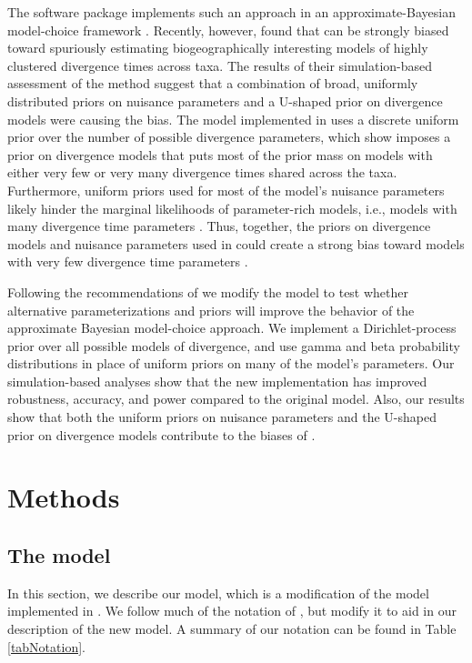\documentclass[letterpaper,12pt]{article}
\begin{document}
\begin{linenumbers}
The software package \msb implements such an approach in an
approximate-Bayesian model-choice framework \citep{Hickerson2006,Huang2011}.
Recently, however, \citet{Oaks2012} found that \msb can be strongly biased
toward spuriously estimating biogeographically interesting models of highly
clustered divergence times across taxa.
The results of their simulation-based assessment of the method suggest that a
combination of broad, uniformly distributed priors on nuisance parameters and a
U-shaped prior on divergence models were causing the bias.
The model implemented in \msb uses a discrete uniform prior over the number of
possible divergence parameters, which \citet{Oaks2012} show imposes a prior on
divergence models that puts most of the prior mass on models with either very
few or very many divergence times shared across the taxa.
Furthermore, uniform priors used for most of the model's nuisance parameters
likely hinder the marginal likelihoods of parameter-rich models, i.e., models
with many divergence time parameters \citep[this is often referred to as
Lindley's paradox;][]{Lindley1957}.
Thus, together, the priors on divergence models and nuisance parameters used in
\msb could create a strong bias toward models with very few divergence time
parameters \citep{Oaks2012}.

Following the recommendations of \citet{Oaks2012} we modify the \msb model to
test whether alternative parameterizations and priors will improve the behavior
of the approximate Bayesian model-choice approach.
We implement a Dirichlet-process prior over all possible models of divergence,
and use gamma and beta probability distributions in place of uniform priors on
many of the model's parameters.
Our simulation-based analyses show that the new implementation has improved
robustness, accuracy, and power compared to the original model.
Also, our results show that both the uniform priors on nuisance parameters and
the U-shaped prior on divergence models contribute to the biases of \msb.


\section*{Methods}

\subsection*{The model}
In this section, we describe our model, which is a modification
of the model implemented in \msb \citep{Huang2011,Oaks2012}.
We follow much of the notation of \citet{Oaks2012}, but modify it to
aid in our description of the new model.
A summary of our notation can be found in Table \ref{tabNotation}.


\end{linenumbers}
\end{document}
